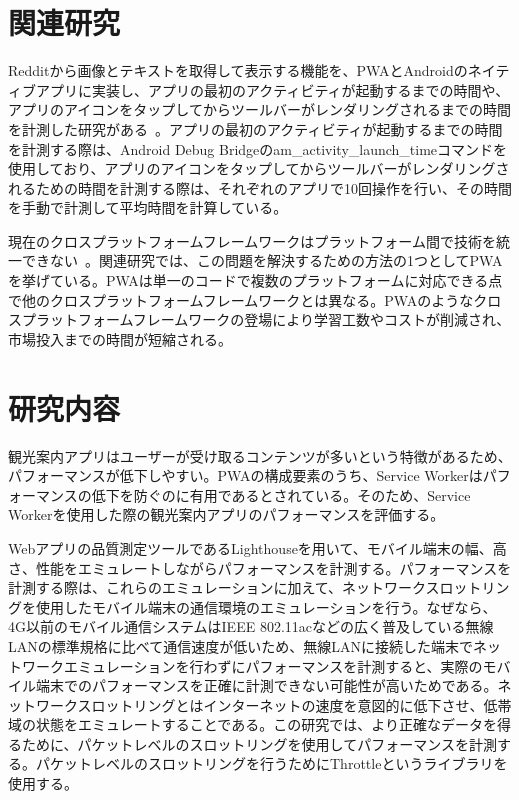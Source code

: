 \begin{multicols*}{2}
\section{関連研究}
Redditから画像とテキストを取得して表示する機能を、PWAとAndroidのネイティブアプリに実装し、アプリの最初のアクティビティが起動するまでの時間や、アプリのアイコンをタップしてからツールバーがレンダリングされるまでの時間を計測した研究がある~\cite{Andreas2018ProgressiveWebApps}。アプリの最初のアクティビティが起動するまでの時間を計測する際は、Android Debug Bridgeのam\_activity\_launch\_timeコマンドを使用しており、アプリのアイコンをタップしてからツールバーがレンダリングされるための時間を計測する際は、それぞれのアプリで10回操作を行い、その時間を手動で計測して平均時間を計算している。

現在のクロスプラットフォームフレームワークはプラットフォーム間で技術を統一できない~\cite{Majchrzak2018ProgressiveWebApps}。関連研究では、この問題を解決するための方法の1つとしてPWAを挙げている。PWAは単一のコードで複数のプラットフォームに対応できる点で他のクロスプラットフォームフレームワークとは異なる。PWAのようなクロスプラットフォームフレームワークの登場により学習工数やコストが削減され、市場投入までの時間が短縮される。
\section{研究内容}
観光案内アプリはユーザーが受け取るコンテンツが多いという特徴があるため、パフォーマンスが低下しやすい。PWAの構成要素のうち、Service Workerはパフォーマンスの低下を防ぐのに有用であるとされている。そのため、Service Workerを使用した際の観光案内アプリのパフォーマンスを評価する。

Webアプリの品質測定ツールであるLighthouseを用いて、モバイル端末の幅、高さ、性能をエミュレートしながらパフォーマンスを計測する。パフォーマンスを計測する際は、これらのエミュレーションに加えて、ネットワークスロットリングを使用したモバイル端末の通信環境のエミュレーションを行う。なぜなら、4G以前のモバイル通信システムはIEEE 802.11acなどの広く普及している無線LANの標準規格に比べて通信速度が低いため、無線LANに接続した端末でネットワークエミュレーションを行わずにパフォーマンスを計測すると、実際のモバイル端末でのパフォーマンスを正確に計測できない可能性が高いためである。ネットワークスロットリングとはインターネットの速度を意図的に低下させ、低帯域の状態をエミュレートすることである。この研究では、より正確なデータを得るために、パケットレベルのスロットリングを使用してパフォーマンスを計測する。パケットレベルのスロットリングを行うためにThrottleというライブラリを使用する。


\end{multicols*}
